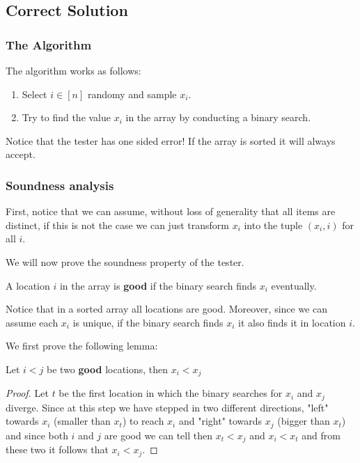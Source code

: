 \subsection{Correct Solution}

\subsubsection{The Algorithm}

The algorithm works as follows:

\begin{enumerate}
    \item Select $i \in \left[n\right]$ randomy and sample $x_i$.
    \item Try to find the value $x_i$ in the array by conducting a binary search.
\end{enumerate}

Notice that the tester has one sided error! If the array is sorted it will always accept.

\subsubsection{Soundness analysis}

First, notice that we can assume, without loss of generality that all items are distinct, if this is not the case we can just transform $x_i$ into the tuple $(x_i, i)$ for all $i$.

We will now prove the soundness property of the tester.
\begin{definition}
A location $i$ in the array is \textbf{good} if the binary search finds $x_i$ eventually.
\end{definition}

Notice that in a sorted array all locations are good.
Moreover, since we can assume each $x_i$ is unique, if the binary search finds $x_i$ it also finds it in location $i$.

We first prove the following lemma:

\begin{lemma}
Let $i<j$ be two \textbf{good} locations, then $x_i < x_j$
\end{lemma}

\begin{proof}
Let $t$ be the first location in which the binary searches for $x_i$ and $x_j$ diverge.
Since at this step we have stepped in two different directions, "left" towards $x_i$ (smaller than $x_t$) to reach $x_i$ and "right" towards $x_j$ (bigger than $x_t$) and since both $i$ and $j$ are good we can tell then $x_t < x_j$ and $x_i < x_t$ and from these two it follows that $x_i < x_j$.
\end{proof}

